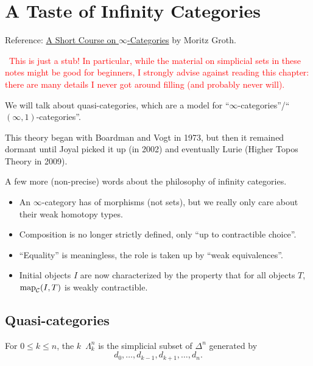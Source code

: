 
\chapter{A Taste of Infinity Categories}


Reference: \href{https://arxiv.org/abs/1007.2925}{A Short Course on $\infty$-Categories} by Moritz Groth.

\warning\ \textcolor{red}{This is just a stub! In particular, while the material on simplicial sets in these notes might be good for beginners, I strongly advise against reading this chapter: there are many details I never got around filling (and probably never will).}

We will talk about quasi-categories, which are a model for \enquote{$\infty$-categories}/\enquote{$(\infty,1)$-categories}.

This theory began with Boardman and Vogt in 1973, but then it remained dormant until Joyal picked it up (in 2002) and eventually Lurie (Higher Topos Theory in 2009).

A few more (non-precise) words about the philosophy of infinity categories.
\begin{itemize}
    \item An $\infty$-category has  of morphisms (not sets), but we really only care about their weak homotopy types.
    
    \item Composition is no longer strictly defined, only \enquote{up to contractible choice}.
    
    \item \enquote{Equality} is meaningless, the role is taken up by \enquote{weak equivalences}.
    
    \item Initial objects $I$ are now characterized by the property that for all objects $T$, $\operatorname{map}_{\mathcal{C}}(I,T)$ is weakly contractible.
\end{itemize}

\section{Quasi-categories}

For $0\le k\le n$, the $k$\alvaropls\ $\Lambda^n_k$ is the simplicial subset of $\Delta^n$ generated by \[d_0,\dots,d_{k-1},d_{k+1},\dots,d_n.\]

